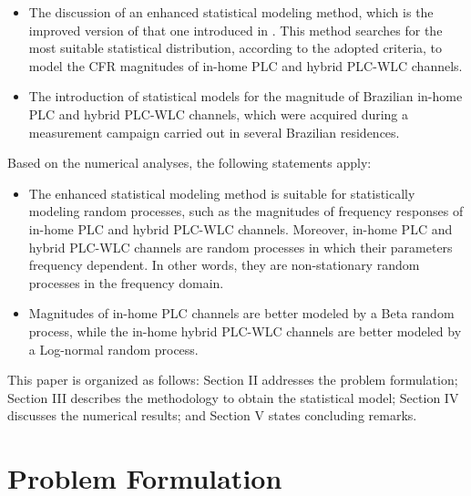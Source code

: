 \documentclass[journal]{IEEEtran}
\begin{document}
\begin{itemize}
	\item The discussion of an enhanced statistical modeling method, which is the improved version of that one introduced in \cite{Luis:AI,Luis:doc}. This method searches for the most suitable statistical distribution, according to the adopted criteria, to model the \ac{CFR} magnitudes of in-home \ac{PLC} and hybrid \ac{PLC}-\ac{WLC} channels.
	
	\item The introduction of statistical models for the magnitude of Brazilian in-home \ac{PLC} and hybrid \ac{PLC}-\ac{WLC} channels, which were acquired during a measurement campaign carried out in several Brazilian residences.%
\end{itemize}
Based on the numerical analyses, the following statements apply:
\begin{itemize}
    \item The enhanced statistical modeling method is suitable for statistically modeling random processes, such as the magnitudes of frequency responses of in-home \ac{PLC} and hybrid \ac{PLC}-\ac{WLC} channels. Moreover, in-home \ac{PLC} and hybrid \ac{PLC}-\ac{WLC} channels are random processes in which their parameters frequency dependent. In other words, they are non-stationary random processes in the frequency domain. 
    \item Magnitudes of in-home \ac{PLC} channels are better modeled by a Beta random process, while the in-home hybrid \ac{PLC}-\ac{WLC} channels are better modeled by a Log-normal random process. 
\end{itemize}

This paper is organized as follows: Section II addresses the problem formulation; Section III describes the methodology to obtain the statistical model; Section IV discusses the numerical results; and Section V states concluding remarks.

\section{Problem Formulation}
\end{document}
